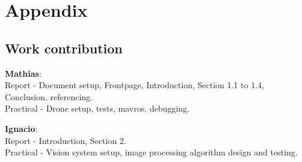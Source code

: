 \chapter{Appendix}
\section*{Work contribution}
\textbf{Mathias}:\\
Report - Document setup, Frontpage,  Introduction, Section  1.1 to 1.4, Conclusion, referencing.\\
Practical - Drone setup, tests, mavros, debugging.

\textbf{Ignacio}:\\
Report - Introduction, Section  2.\\
Practical - Vision system setup, image processing algorithm design and testing.

\newpage